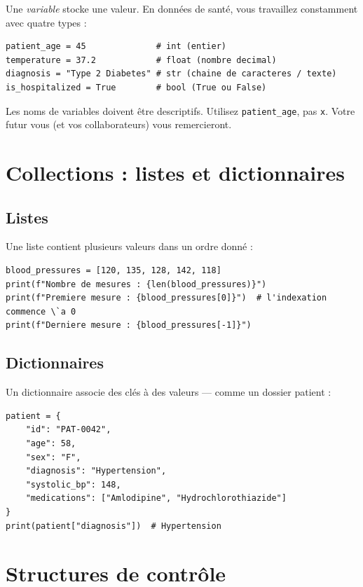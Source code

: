 Une \emph{variable} stocke une valeur. En donn\'ees de sant\'e, vous travaillez constamment avec quatre types :

\begin{verbatim}
patient_age = 45              # int (entier)
temperature = 37.2            # float (nombre decimal)
diagnosis = "Type 2 Diabetes" # str (chaine de caracteres / texte)
is_hospitalized = True        # bool (True ou False)
\end{verbatim}

\begin{pythontip}
Les noms de variables doivent \^etre descriptifs. Utilisez \texttt{patient\_age}, pas \texttt{x}. Votre futur vous (et vos collaborateurs) vous remercieront.
\end{pythontip}

\section{Collections : listes et dictionnaires}

\subsection{Listes}

Une liste contient plusieurs valeurs dans un ordre donn\'e :
\begin{verbatim}
blood_pressures = [120, 135, 128, 142, 118]
print(f"Nombre de mesures : {len(blood_pressures)}")
print(f"Premiere mesure : {blood_pressures[0]}")  # l'indexation commence \`a 0
print(f"Derniere mesure : {blood_pressures[-1]}")
\end{verbatim}

\subsection{Dictionnaires}

Un dictionnaire associe des cl\'es \`a des valeurs --- comme un dossier patient :
\begin{verbatim}
patient = {
    "id": "PAT-0042",
    "age": 58,
    "sex": "F",
    "diagnosis": "Hypertension",
    "systolic_bp": 148,
    "medications": ["Amlodipine", "Hydrochlorothiazide"]
}
print(patient["diagnosis"])  # Hypertension
\end{verbatim}

\section{Structures de contr\^ole}


